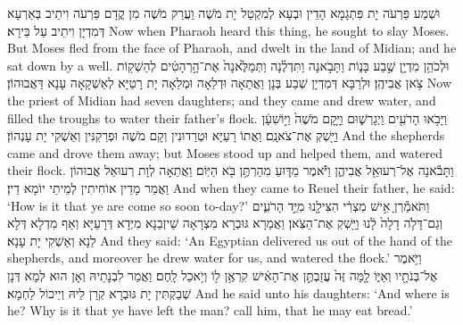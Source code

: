 {וּשְׁמַע פַּרְעֹה יָת פִּתְגָמָא הָדֵין וּבְעָא לְמִקְטַל יָת מֹשֶׁה וַעֲרַק מֹשֶׁה מִן קֳדָם פַּרְעֹה וִיתֵיב בְּאַרְעָא דְּמִדְיָן וִיתֵיב עַל בֵּירָא׃}
{Now when Pharaoh heard this thing, he sought to slay Moses. But Moses fled from the face of Pharaoh, and dwelt in the land of Midian; and he sat down by a well.}{}
{וּלְכֹהֵ֥ן מִדְיָ֖ן שֶׁ֣בַע בָּנ֑וֹת וַתָּבֹ֣אנָה וַתִּדְלֶ֗נָה וַתְּמַלֶּ֙אנָה֙ אֶת־הָ֣רְהָטִ֔ים לְהַשְׁק֖וֹת צֹ֥אן אֲבִיהֶֽן׃
}
{וּלְרַבָּא דְּמִדְיָן שְׁבַע בְּנָן וַאֲתַאָה וּדְלַאָה וּמְלַאָה יָת רָטַיָּא לְאַשְׁקָאָה עָנָא דַּאֲבוּהוֹן׃}
{Now the priest of Midian had seven daughters; and they came and drew water, and filled the troughs to water their father’s flock.}{}
{וַיָּבֹ֥אוּ הָרֹעִ֖ים וַיְגָרְשׁ֑וּם וַיָּ֤קׇם מֹשֶׁה֙ וַיּ֣וֹשִׁעָ֔ן וַיַּ֖שְׁקְ אֶת־צֹאנָֽם׃
}
{וַאֲתוֹ רָעַיָּא וּטְרַדוּנִין וְקָם מֹשֶׁה וּפְרַקִנִּין וְאַשְׁקִי יָת עָנְהוֹן׃}
{And the shepherds came and drove them away; but Moses stood up and helped them, and watered their flock.}{}
{וַתָּבֹ֕אנָה אֶל־רְעוּאֵ֖ל אֲבִיהֶ֑ן וַיֹּ֕אמֶר מַדּ֛וּעַ מִהַרְתֶּ֥ן בֹּ֖א הַיּֽוֹם׃}
{וַאֲתַאָה לְוָת רְעוּאֵל אֲבוּהוֹן וַאֲמַר מָדֵין אוֹחִיתִין לְמֵיתֵי יוֹמָא דֵין׃}
{And when they came to Reuel their father, he said: ‘How is it that ye are come so soon to-day?’}{}
{וַתֹּאמַ֕רְןָ אִ֣ישׁ מִצְרִ֔י הִצִּילָ֖נוּ מִיַּ֣ד הָרֹעִ֑ים וְגַם־דָּלֹ֤ה דָלָה֙ לָ֔נוּ וַיַּ֖שְׁקְ אֶת־הַצֹּֽאן׃}
{וַאֲמַרָא גּוּבְרָא מִצְרָאָה שֵׁיזְבַנָא מִיְּדָא דְּרָעַיָּא וְאַף מִדְלָא דְּלָא לַנָא וְאַשְׁקִי יָת עָנָא׃}
{And they said: ‘An Egyptian delivered us out of the hand of the shepherds, and moreover he drew water for us, and watered the flock.’}{}
{וַיֹּ֥אמֶר אֶל־בְּנֹתָ֖יו וְאַיּ֑וֹ לָ֤מָּה זֶּה֙ עֲזַבְתֶּ֣ן אֶת־הָאִ֔ישׁ קִרְאֶ֥ן ל֖וֹ וְיֹ֥אכַל לָֽחֶם׃
}
{וַאֲמַר לִבְנָתֵיהּ וְאָן הוּא לְמָא דְּנָן שְׁבַקְתִּין יָת גּוּבְרָא קְרַן לֵיהּ וְיֵיכוֹל לַחְמָא׃}
{And he said unto his daughters: ‘And where is he? Why is it that ye have left the man? call him, that he may eat bread.’}{}
